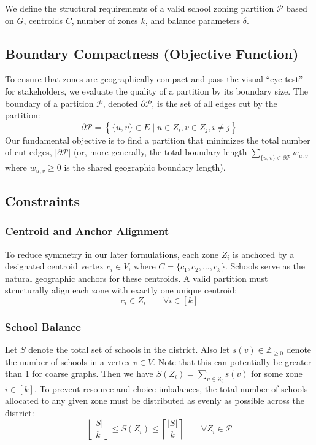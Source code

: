 \documentclass{article}
\begin{document}
We define the structural requirements of a valid school zoning partition $\mathcal{P}$ based on $G$, centroids $C$, number of zones $k$, and balance parameters $\delta$.

\subsection{Boundary Compactness (Objective Function)}
To ensure that zones are geographically compact and pass the visual ``eye test'' for stakeholders, we evaluate the quality of a partition by its boundary size. The boundary of a partition $\mathcal{P}$, denoted $\partial \mathcal{P}$, is the set of all edges cut by the partition:
$$\partial \mathcal{P} = \left\{\{u,v\} \in E \mid u \in Z_i, v \in Z_j, i \neq j\right\}$$
Our fundamental objective is to find a partition that minimizes the total number of cut edges, $|\partial \mathcal{P}|$ (or, more generally, the total boundary length $\sum_{\{u,v\} \in \partial \mathcal{P}} w_{u,v}$ where $w_{u,v} \ge 0$ is the shared geographic boundary length).

\subsection{Constraints}
\subsubsection{Centroid and Anchor Alignment}
To reduce symmetry in our later formulations, each zone $Z_i$ is anchored by a designated centroid vertex $c_i \in V$, where $C = \{c_1, c_2, \ldots, c_k \}$. Schools serve as the natural geographic anchors for these centroids. A valid partition must structurally align each zone with exactly one unique centroid:
$$c_i \in Z_i \qquad \forall i \in [k]$$

\subsubsection{School Balance}
Let $S$ denote the total set of schools in the district. Also let $s(v) \in \mathbb{Z}_{\geq 0}$ denote the number of schools in a vertex $v\in V$. Note that this can potentially be greater than 1 for coarse graphs. Then we have $S(Z_i) = \sum_{v \in Z_i} s(v)$ for some zone $i \in [k]$. To prevent resource and choice imbalances, the total number of schools allocated to any given zone must be distributed as evenly as possible across the district:
$$\left\lfloor \frac{|S|}{k} \right\rfloor \leq S(Z_i) \leq \left\lceil \frac{|S|}{k} \right\rceil \qquad \forall Z_i \in \mathcal{P}$$
\end{document}
